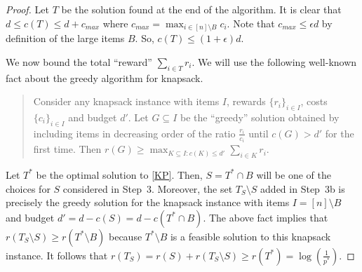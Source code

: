 \documentclass[11pt]{article}
\theoremstyle{remark}
\theoremstyle{plain}
\theoremstyle{remark}
\begin{document}
\begin{proof}
Let $T$ be  the solution found at the end of the algorithm. It is clear that  $d \le c(T) \le d+c_{max}$ where $c_{max}=\max_{i\in [n]\setminus B}  c_i$. Note that $c_{max}\le \epsilon d$ by definition of the large items $B$. So,  $c(T) \leq (1+\epsilon)d$. 

We now bound the total ``reward'' $\sum_{i\in T} r_i$. We will use the following well-known fact about the greedy algorithm for knapsack.
\begin{quote}
    Consider any knapsack instance with items $I$, rewards $\{r_i\}_{i\in I}$, costs $\{c_i\}_{i\in I}$ and budget $d'$. Let $G\subseteq I$ be the ``greedy'' solution obtained by including items in decreasing order of the ratio $\frac{r_i}{c_i}$ until $c(G)>d'$ for the first time. Then $r(G)\ge \max_{K\subseteq I: c(K)\le d'} \sum_{i\in K}r_i$. 
\end{quote}


Let $T^*$ be the optimal solution to \eqref{KP}. Then, $S=T^*\cap B$ will be one of the choices for $S$ considered in Step~3. Moreover, the set $T_S\setminus S$ added in Step~3b is precisely  the greedy solution for the knapsack instance with  items $I=[n]\setminus B$ and budget $d'=d-c(S)=d-c(T^*\cap B)$. The above fact implies that $r(T_S\setminus S)\ge r(T^*\setminus B)$ because $T^*\setminus B$ is a feasible solution to this knapsack instance.
It follows that $r(T_S)=r(S)+r(T_S\setminus S)\ge r(T^*)=\log(\frac1{p^*})$. 
\end{proof}
\end{document}
